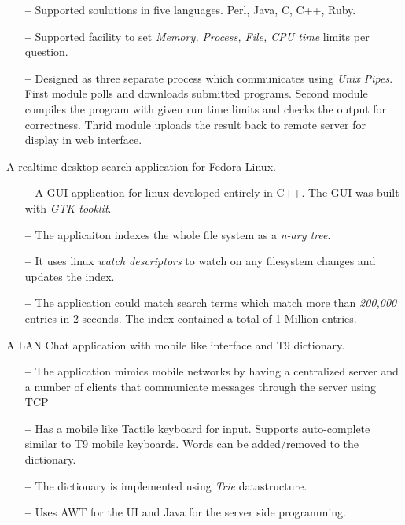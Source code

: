 \documentclass{cv}
\begin{document}
\begin{description}[leftmargin=50pt,labelwidth=50pt]
\begin{itemize}[label={},leftmargin=10pt,topsep=0pt]
      \item[\textbf{--}] Supported soulutions in five languages. Perl, Java, C, C++, Ruby.
      \item[\textbf{--}] Supported facility to set \textit{Memory, Process, File, CPU time} limits per question.
      \item[\textbf{--}] Designed as three separate process which communicates using \textit{Unix Pipes}.  First module polls and downloads submitted programs.  Second module compiles the program with given run time limits and checks the output for correctness.  Thrid module uploads the result back to remote server for display in web interface.
    \end{itemize}
  \item[Desktop Search] A realtime desktop search application for Fedora Linux.
    \begin{itemize}[label={},leftmargin=10pt,topsep=0pt]
      \item[\textbf{--}] A GUI application for linux developed entirely in C++.  The GUI was built with \textit{GTK tooklit}.
      \item[\textbf{--}] The applicaiton indexes the whole file system as a \textit{n-ary tree}.
      \item[\textbf{--}] It uses linux \textit{watch descriptors} to watch on any filesystem changes and updates the index.
      \item[\textbf{--}] The application could match search terms which match more than \textit{200,000} entries in 2 seconds.  The index contained a total of 1 Million entries.
    \end{itemize}
  \item[SMS Simulator] A LAN Chat application with mobile like interface and T9 dictionary.
    \begin{itemize}[label={},leftmargin=10pt,topsep=0pt]
      \item[\textbf{--}] The application mimics mobile networks by having a centralized server and a number of clients that communicate messages through the server using TCP\@
      \item[\textbf{--}] Has a mobile like Tactile keyboard for input.  Supports auto-complete similar to T9 mobile keyboards.  Words can be added/removed to the dictionary.
      \item[\textbf{--}] The dictionary is implemented using \textit{Trie} datastructure.
      \item[\textbf{--}] Uses AWT for the UI and Java for the server side programming.
    \end{itemize}
\end{description}
\end{document}
